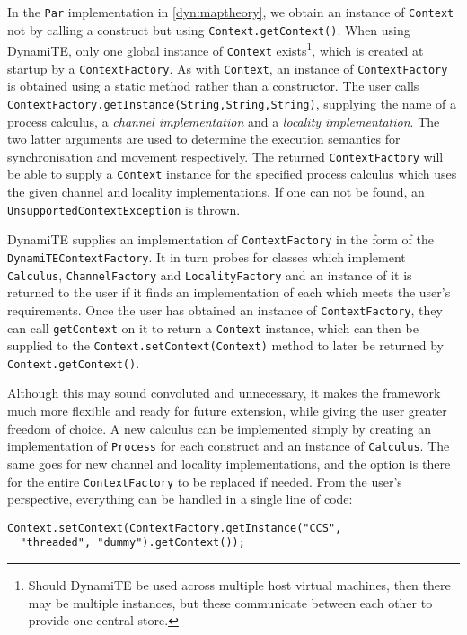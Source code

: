 In the \texttt{Par} implementation in \ref{dyn:maptheory}, we obtain
an instance of \texttt{Context} not by calling a construct but using
\texttt{Context.getContext()}.  When using DynamiTE, only one global
instance of \texttt{Context} exists\footnote{Should DynamiTE be used
  across multiple host virtual machines, then there may be multiple
  instances, but these communicate between each other to provide one
  central store.}, which is created at startup by a
\texttt{ContextFactory}.  As with \texttt{Context}, an instance of
\texttt{ContextFactory} is obtained using a static method rather than
a constructor.  The user calls
\texttt{ContextFactory.getInstance(String,String,String)}, supplying
the name of a process calculus, a \emph{channel implementation} and a
\emph{locality implementation}.  The two latter arguments are used to
determine the execution semantics for synchronisation and movement
respectively.  The returned \texttt{ContextFactory} will be able to
supply a \texttt{Context} instance for the specified process calculus
which uses the given channel and locality implementations.  If one can
not be found, an \texttt{UnsupportedContextException} is thrown.

DynamiTE supplies an implementation of \texttt{ContextFactory} in the
form of the\\ \texttt{DynamiTEContextFactory}.  It in turn probes for
classes which implement \texttt{Calculus}, \texttt{ChannelFactory} and
\texttt{LocalityFactory} and an instance of it is returned to the user
if it finds an implementation of each which meets the user's
requirements.  Once the user has obtained an instance of
\texttt{ContextFactory}, they can call \texttt{getContext} on it to
return a \texttt{Context} instance, which can then be supplied to the
\texttt{Context.setContext(Context)} method to later be returned by
\texttt{Context.getContext()}.

Although this may sound convoluted and unnecessary, it makes the
framework much more flexible and ready for future extension, while
giving the user greater freedom of choice.  A new calculus can be
implemented simply by creating an implementation of \texttt{Process}
for each construct and an instance of \texttt{Calculus}.  The same
goes for new channel and locality implementations, and the option is
there for the entire \texttt{ContextFactory} to be replaced if needed.
From the user's perspective, everything can be handled in a single
line of code:

\begin{verbatim}
Context.setContext(ContextFactory.getInstance("CCS",
  "threaded", "dummy").getContext());
\end{verbatim}


